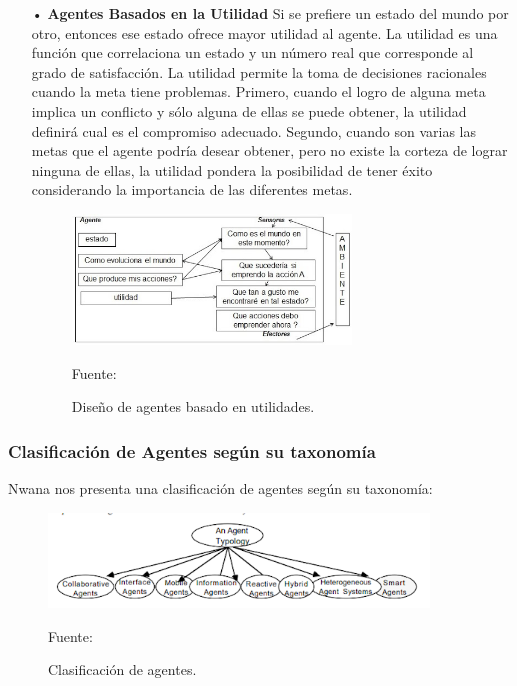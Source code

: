 \begin{itemize}
\item[•] {\bf Agentes Basados en la Utilidad} \vskip 0.1cm
Si se prefiere un estado del mundo por otro, entonces ese estado ofrece mayor utilidad al agente. La utilidad es una función que correlaciona un estado y un número real que corresponde al grado de satisfacción.
\vskip 0.1cm
La utilidad permite la toma de decisiones racionales cuando la meta tiene problemas. Primero, cuando el logro de alguna meta implica un conflicto y sólo alguna de ellas se puede obtener, la utilidad definirá cual es el compromiso adecuado. Segundo, cuando son varias las metas que el agente podría desear obtener, pero no existe la corteza de lograr ninguna de ellas, la utilidad pondera la posibilidad de tener éxito considerando la importancia de las diferentes metas.

\begin{figure}[ht]
\begin{center}
\includegraphics[width=0.7\textwidth]{Imagen6}
\end{center}
\begin{center}
\vskip -0.5cm
\caption{\small{Diseño de agentes basado en utilidades.}}
{\small{Fuente: \cite{FALTA}}}
\end{center}
\end{figure}

\end{itemize}

\subsubsection{Clasificación de Agentes según su taxonomía}
Nwana nos presenta una clasificación de agentes según su taxonomía:

\begin{figure}[ht]
\begin{center}
\includegraphics[width=0.9\textwidth]{Imagen7}
\end{center}
\begin{center}
\vskip -0.5cm
\caption{\small{Clasificación de agentes.}}
{\small{Fuente: \cite{FALTA}}}
\end{center}
\end{figure}

